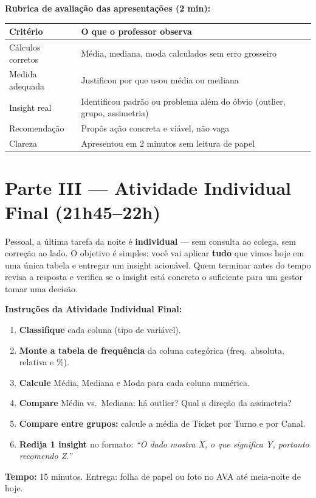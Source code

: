 \begin{SolvedBox}
\textbf{Rubrica de avaliação das apresentações (2 min):}
\begin{tabular}{|p{3.5cm}|p{9.5cm}|}
\hline
\textbf{Critério} & \textbf{O que o professor observa} \\
\hline
Cálculos corretos & Média, mediana, moda calculados sem erro grosseiro \\
Medida adequada   & Justificou por que usou média ou mediana \\
Insight real      & Identificou padrão ou problema além do óbvio (outlier, grupo, assimetria) \\
Recomendação      & Propôs ação concreta e viável, não vaga \\
Clareza           & Apresentou em 2 minutos sem leitura de papel \\
\hline
\end{tabular}
\end{SolvedBox}

\section{Parte III — Atividade Individual Final (21h45–22h)}

Pessoal, a última tarefa da noite é \textbf{individual} — sem consulta ao
colega, sem correção ao lado. O objetivo é simples: você vai aplicar
\textbf{tudo} que vimos hoje em uma única tabela e entregar um insight acionável.
Quem terminar antes do tempo revisa a resposta e verifica se o insight está
concreto o suficiente para um gestor tomar uma decisão.

\begin{SolvedBox}
\textbf{Instruções da Atividade Individual Final:}
\begin{enumerate}
  \item \textbf{Classifique} cada coluna (tipo de variável).
  \item \textbf{Monte a tabela de frequência} da coluna categórica (freq.\ absoluta, relativa e \%).
  \item \textbf{Calcule} Média, Mediana e Moda para cada coluna numérica.
  \item \textbf{Compare} Média vs.\ Mediana: há outlier? Qual a direção da assimetria?
  \item \textbf{Compare entre grupos:} calcule a média de Ticket por Turno e por Canal.
  \item \textbf{Redija 1 insight} no formato: \emph{``O dado mostra X, o que significa Y,
  portanto recomendo Z.''}
\end{enumerate}
\textbf{Tempo:} 15 minutos. Entrega: folha de papel ou foto no AVA até meia-noite de hoje.
\end{SolvedBox}


